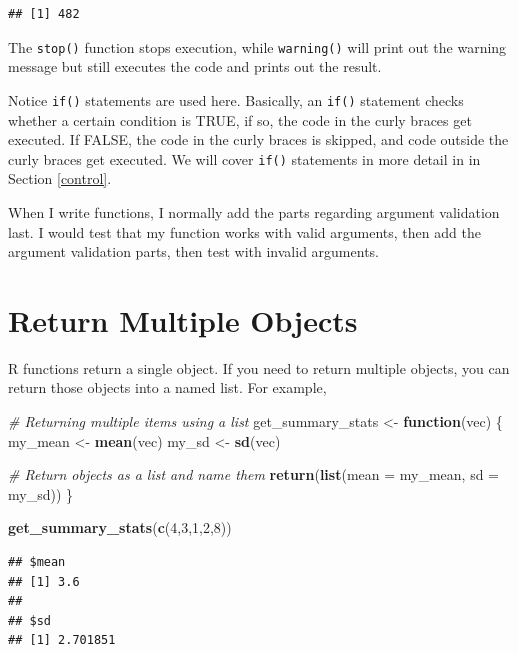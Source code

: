 \documentclass[
]{book}
\newenvironment{Shaded}{\begin{snugshade}}{\end{snugshade}}
\newcommand{\AttributeTok}[1]{\textcolor[rgb]{0.13,0.29,0.53}{#1}}
\newcommand{\CommentTok}[1]{\textcolor[rgb]{0.56,0.35,0.01}{\textit{#1}}}
\newcommand{\ControlFlowTok}[1]{\textcolor[rgb]{0.13,0.29,0.53}{\textbf{#1}}}
\newcommand{\DecValTok}[1]{\textcolor[rgb]{0.00,0.00,0.81}{#1}}
\newcommand{\FunctionTok}[1]{\textcolor[rgb]{0.13,0.29,0.53}{\textbf{#1}}}
\newcommand{\NormalTok}[1]{#1}
\newcommand{\OtherTok}[1]{\textcolor[rgb]{0.56,0.35,0.01}{#1}}
\theoremstyle{definition}
\theoremstyle{definition}
\theoremstyle{definition}
\theoremstyle{definition}
\theoremstyle{remark}
\begin{document}
\begin{verbatim}
## [1] 482
\end{verbatim}

The \texttt{stop()} function stops execution, while \texttt{warning()} will print out the warning message but still executes the code and prints out the result.

Notice \texttt{if()} statements are used here. Basically, an \texttt{if()} statement checks whether a certain condition is TRUE, if so, the code in the curly braces get executed. If FALSE, the code in the curly braces is skipped, and code outside the curly braces get executed. We will cover \texttt{if()} statements in more detail in in Section \ref{control}.

When I write functions, I normally add the parts regarding argument validation last. I would test that my function works with valid arguments, then add the argument validation parts, then test with invalid arguments.

\hypertarget{funcMult}{%
\section{Return Multiple Objects}\label{funcMult}}

R functions return a single object. If you need to return multiple objects, you can return those objects into a named list. For example,

\begin{Shaded}
\begin{Highlighting}[]
\CommentTok{\# Returning multiple items using a list}
\NormalTok{get\_summary\_stats }\OtherTok{\textless{}{-}} \ControlFlowTok{function}\NormalTok{(vec) \{}
\NormalTok{  my\_mean }\OtherTok{\textless{}{-}} \FunctionTok{mean}\NormalTok{(vec)}
\NormalTok{  my\_sd   }\OtherTok{\textless{}{-}} \FunctionTok{sd}\NormalTok{(vec)}
  
  \CommentTok{\# Return objects as a list and name them}
  \FunctionTok{return}\NormalTok{(}\FunctionTok{list}\NormalTok{(}\AttributeTok{mean =}\NormalTok{ my\_mean, }\AttributeTok{sd =}\NormalTok{ my\_sd)) }
\NormalTok{\}}

\FunctionTok{get\_summary\_stats}\NormalTok{(}\FunctionTok{c}\NormalTok{(}\DecValTok{4}\NormalTok{,}\DecValTok{3}\NormalTok{,}\DecValTok{1}\NormalTok{,}\DecValTok{2}\NormalTok{,}\DecValTok{8}\NormalTok{))}
\end{Highlighting}
\end{Shaded}

\begin{verbatim}
## $mean
## [1] 3.6
## 
## $sd
## [1] 2.701851
\end{verbatim}
\end{document}

